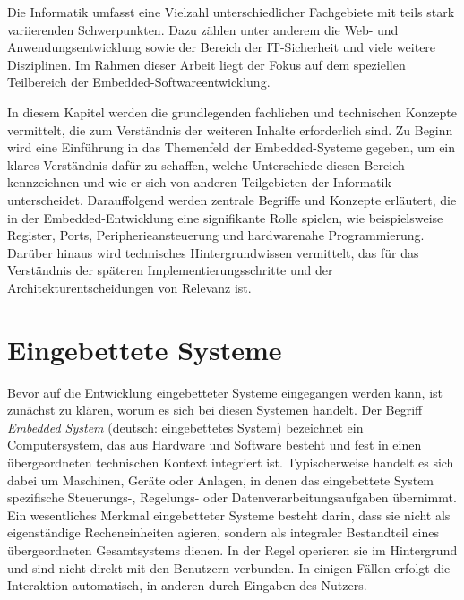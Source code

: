 
Die Informatik umfasst eine Vielzahl unterschiedlicher Fachgebiete mit teils stark variierenden Schwerpunkten. 
Dazu zählen unter anderem die Web- und Anwendungsentwicklung sowie der Bereich der IT-Sicherheit und viele weitere Disziplinen. 
Im Rahmen dieser Arbeit liegt der Fokus auf dem speziellen Teilbereich der Embedded-Softwareentwicklung.

In diesem Kapitel werden die grundlegenden fachlichen und technischen Konzepte vermittelt, die zum Verständnis der weiteren Inhalte erforderlich sind.
Zu Beginn wird eine Einführung in das Themenfeld der Embedded-Systeme gegeben, um ein klares Verständnis dafür zu schaffen, welche Unterschiede diesen Bereich kennzeichnen und wie er sich von anderen Teilgebieten der Informatik unterscheidet.
Darauffolgend werden zentrale Begriffe und Konzepte erläutert, die in der Embedded-Entwicklung eine signifikante Rolle spielen, wie beispielsweise Register, Ports, Peripherieansteuerung und hardwarenahe Programmierung.
Darüber hinaus wird technisches Hintergrundwissen vermittelt, das für das Verständnis der späteren Implementierungsschritte und der Architekturentscheidungen von Relevanz ist.


\section{Eingebettete Systeme}
Bevor auf die Entwicklung eingebetteter Systeme eingegangen werden kann, ist zunächst zu klären, worum es sich bei diesen Systemen handelt.
Der Begriff \emph{Embedded System} (deutsch: eingebettetes System) bezeichnet ein Computersystem, das aus Hardware und Software besteht und fest in einen übergeordneten technischen Kontext integriert ist. 
Typischerweise handelt es sich dabei um Maschinen, Geräte oder Anlagen, in denen das eingebettete System spezifische Steuerungs-, Regelungs- oder Datenverarbeitungsaufgaben übernimmt.
Ein wesentliches Merkmal eingebetteter Systeme besteht darin, dass sie nicht als eigenständige Recheneinheiten agieren, sondern als integraler Bestandteil eines übergeordneten Gesamtsystems dienen.
In der Regel operieren sie im Hintergrund und sind nicht direkt mit den Benutzern verbunden. In einigen Fällen erfolgt die Interaktion automatisch, in anderen durch Eingaben des Nutzers.

